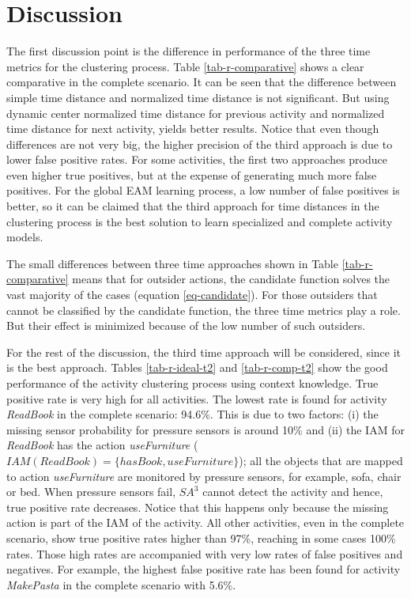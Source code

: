 \section{Discussion}
\label{sec:evaluation:discussion}

The first discussion point is the difference in performance of the three time metrics for the clustering process. Table \ref{tab-r-comparative} shows a clear comparative in the complete scenario. It can be seen that the difference between simple time distance and normalized time distance is not significant. But using dynamic center normalized time distance for previous activity and normalized time distance for next activity, yields better results. Notice that even though differences are not very big, the higher precision of the third approach is due to lower false positive rates. For some activities, the first two approaches produce even higher true positives, but at the expense of generating much more false positives. For the global EAM learning process, a low number of false positives is better, so it can be claimed that the third approach for time distances in the clustering process is the best solution to learn specialized and complete activity models.

The small differences between three time approaches shown in Table \ref{tab-r-comparative} means that for outsider actions, the candidate function solves the vast majority of the cases (equation \ref{eq-candidate}). For those outsiders that cannot be classified by the candidate function, the three time metrics play a role. But their effect is minimized because of the low number of such outsiders.

For the rest of the discussion, the third time approach will be considered, since it is the best approach. Tables \ref{tab-r-ideal-t2} and \ref{tab-r-comp-t2} show the good performance of the activity clustering process using context knowledge. True positive rate is very high for all activities. The lowest rate is found for activity \textit{ReadBook} in the complete scenario: 94.6\%. This is due to two factors: (i) the missing sensor probability for pressure sensors is around 10\% and (ii) the IAM for \textit{ReadBook} has the action \textit{useFurniture} ($IAM(ReadBook) = \{hasBook, useFurniture\}$); all the objects that are mapped to action \textit{useFurniture} are monitored by pressure sensors, for example, sofa, chair or bed. When pressure sensors fail, $SA^3$ cannot detect the activity and hence, true positive rate decreases. Notice that this happens only because the missing action is part of the IAM of the activity. All other activities, even in the complete scenario, show true positive rates higher than 97\%, reaching in some cases 100\% rates. Those high rates are accompanied with very low rates of false positives and negatives. For example, the highest false positive rate has been found for activity \textit{MakePasta} in the complete scenario with 5.6\%. 

